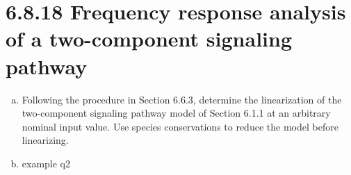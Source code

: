 \documentclass[paper=a4, fontsize=11pt]{scrartcl} %
\numberwithin{equation}{section} %
\numberwithin{figure}{section} %
\numberwithin{table}{section} %
\begin{document}
\section{6.8.18 Frequency response analysis of a two-component signaling pathway}
	\begin{enumerate}[a)]
		\item Following the procedure in Section 6.6.3, determine the linearization of the two-component signaling pathway model of Section 6.1.1 at an arbitrary nominal input value. Use species conservations to reduce the model before linearizing.

		\item example q2
	\end{enumerate}
\end{document}

